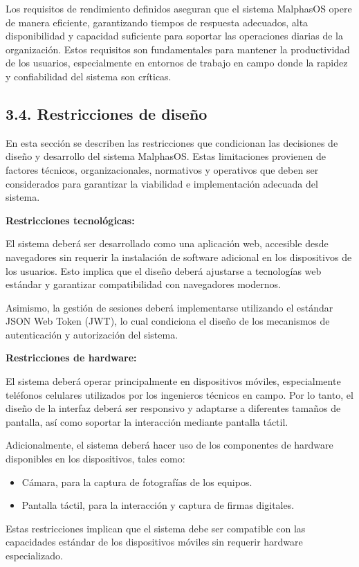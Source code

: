 \documentclass[12pt,a4paper]{article}
\newcommand{\subsectiontitle}[1]{%
  \subsection*{#1}
  \addcontentsline{toc}{subsection}{#1}
}
\begin{document}
Los requisitos de rendimiento definidos aseguran que el sistema MalphasOS opere de manera eficiente, garantizando tiempos de respuesta adecuados, alta disponibilidad y capacidad suficiente para soportar las operaciones diarias de la organización. Estos requisitos son fundamentales para mantener la productividad de los usuarios, especialmente en entornos de trabajo en campo donde la rapidez y confiabilidad del sistema son críticas.

\subsectiontitle{3.4. Restricciones de diseño}

En esta sección se describen las restricciones que condicionan las decisiones de diseño y desarrollo del sistema MalphasOS. Estas limitaciones provienen de factores técnicos, organizacionales, normativos y operativos que deben ser considerados para garantizar la viabilidad e implementación adecuada del sistema.

\textbf{Restricciones tecnológicas:}

El sistema deberá ser desarrollado como una aplicación web, accesible desde navegadores sin requerir la instalación de software adicional en los dispositivos de los usuarios. Esto implica que el diseño deberá ajustarse a tecnologías web estándar y garantizar compatibilidad con navegadores modernos.

Asimismo, la gestión de sesiones deberá implementarse utilizando el estándar JSON Web Token (JWT), lo cual condiciona el diseño de los mecanismos de autenticación y autorización del sistema.

\textbf{Restricciones de hardware:}

El sistema deberá operar principalmente en dispositivos móviles, especialmente teléfonos celulares utilizados por los ingenieros técnicos en campo. Por lo tanto, el diseño de la interfaz deberá ser responsivo y adaptarse a diferentes tamaños de pantalla, así como soportar la interacción mediante pantalla táctil.

Adicionalmente, el sistema deberá hacer uso de los componentes de hardware disponibles en los dispositivos, tales como:

\begin{itemize}
  \item Cámara, para la captura de fotografías de los equipos.

  \item Pantalla táctil, para la interacción y captura de firmas digitales.
\end{itemize}

Estas restricciones implican que el sistema debe ser compatible con las capacidades estándar de los dispositivos móviles sin requerir hardware especializado.
\end{document}
